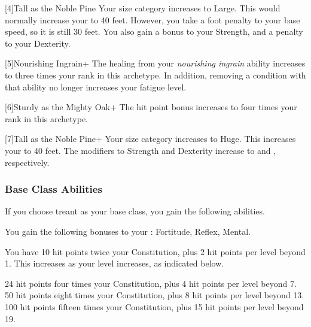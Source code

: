            [4]{Tall as the Noble Pine} Your size category increases to Large.
            This would normally increase your  to 40 feet.
            However, you take a  foot penalty to your base speed, so it is still 30 feet.
            You also gain a  bonus to your Strength, and a  penalty to your Dexterity.

            [5]{Nourishing Ingrain+} The healing from your \textit{nourishing ingrain} ability increases to three times your rank in this archetype.
            In addition, removing a condition with that ability no longer increases your fatigue level.

            [6]{Sturdy as the Mighty Oak+} The hit point bonus increases to four times your rank in this archetype.

            [7]{Tall as the Noble Pine+} Your size category increases to Huge.
            This increases your  to 40 feet.
            The modifiers to Strength and Dexterity increase to  and , respectively.

        \subsubsection{Base Class Abilities}
            If you choose treant as your base class, you gain the following abilities.

            You gain the following bonuses to your :  Fortitude,  Reflex,  Mental.

                You have 10 hit points \add twice your Constitution, plus 2 hit points per level beyond 1.
                This increases as your level increases, as indicated below.
                \begin{itemize}
                     24 hit points \add four times your Constitution, plus 4 hit points per level beyond 7.
                     50 hit points \add eight times your Constitution, plus 8 hit points per level beyond 13.
                     100 hit points \add fifteen times your Constitution, plus 15 hit points per level beyond 19.
                \end{itemize}

